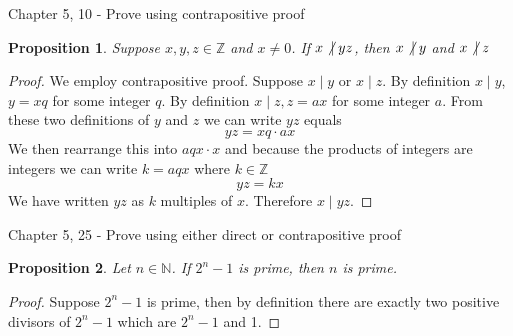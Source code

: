 \documentclass[12pt,letterpaper, onecolumn]{exam}
\newtheorem*{prop}{Proposition}
\newcommand{\doesnotdivide}{\not\hspace{2.5pt}\mid}
\begin{document}
\noindent Chapter 5, 10 - Prove using contrapositive proof
\begin{prop}
	
Suppose $x,y,z \in \mathbb{Z}$ and $x\neq0$. If $x\doesnotdivide yz$, then $x\doesnotdivide y$ and $x\doesnotdivide z$
	
\end{prop}

\begin{proof}
	
We employ contrapositive proof. Suppose $x\mid y$ or $x\mid z$. By definition  $x\mid y$, $y=xq$ for some integer $q$. By definition  $x\mid z, z=ax$ for some integer $a$. From these two definitions of $y$ and $z$ we can write $yz$ equals
$$yz=xq\cdot ax$$
We then rearrange this into $aqx\cdot x$ and because the products of integers are integers we can write $k=aqx$ where $k\in\mathbb{Z}$
$$yz=kx$$
We have written $yz$ as $k$ multiples of $x$. Therefore $x\mid yz.$
\end{proof}

\noindent Chapter 5, 25 - Prove using either direct or contrapositive proof
\begin{prop}
	
Let $n\in\mathbb{N}$. If $2^n-1$ is prime, then $n$ is prime.
	
\end{prop}

\begin{proof}
	Suppose $2^n-1$ is prime, then by definition there are exactly two positive divisors of $2^n-1$ which are $2^n-1$ and 1. 
\end{proof}
\end{document}

